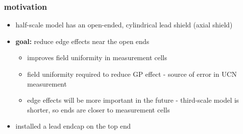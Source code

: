 \documentclass{beamer}
\begin{document}
\begin{frame}
\frametitle{motivation}

    \begin{itemize}
        \item half-scale model has an open-ended, cylindrical lead shield (axial shield) \pause
        \item \textbf{goal:} reduce edge effects near the open ends \pause
            \begin{itemize}
                \item improves field uniformity in measurement cells \pause
                \item field uniformity required to reduce GP effect - source of error in UCN measurement \pause
                \item edge effects will be more important in the future - third-scale model is shorter,
                    so ends are closer to measurement cells\pause
            \end{itemize}
        \item installed a lead endcap on the top end
    \end{itemize}

\end{frame}
\end{document}
